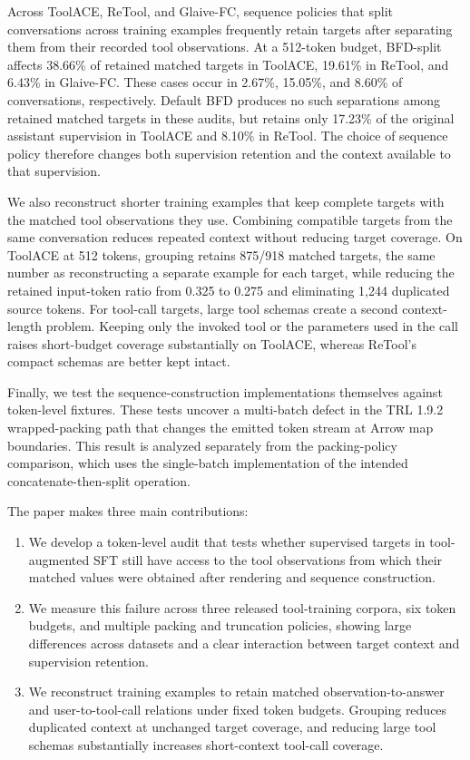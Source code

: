 \documentclass[pdflatex,sn-basic,Numbered]{sn-jnl}
\begin{document}
Across ToolACE, ReTool, and Glaive-FC, sequence policies that split conversations across training examples frequently retain targets after separating them from their recorded tool observations. At a 512-token budget, BFD-split affects 38.66\% of retained matched targets in ToolACE, 19.61\% in ReTool, and 6.43\% in Glaive-FC. These cases occur in 2.67\%, 15.05\%, and 8.60\% of conversations, respectively. Default BFD produces no such separations among retained matched targets in these audits, but retains only 17.23\% of the original assistant supervision in ToolACE and 8.10\% in ReTool. The choice of sequence policy therefore changes both supervision retention and the context available to that supervision.

We also reconstruct shorter training examples that keep complete targets with the matched tool observations they use. Combining compatible targets from the same conversation reduces repeated context without reducing target coverage. On ToolACE at 512 tokens, grouping retains 875/918 matched targets, the same number as reconstructing a separate example for each target, while reducing the retained input-token ratio from 0.325 to 0.275 and eliminating 1,244 duplicated source tokens. For tool-call targets, large tool schemas create a second context-length problem. Keeping only the invoked tool or the parameters used in the call raises short-budget coverage substantially on ToolACE, whereas ReTool's compact schemas are better kept intact.

Finally, we test the sequence-construction implementations themselves against token-level fixtures. These tests uncover a multi-batch defect in the TRL 1.9.2 wrapped-packing path that changes the emitted token stream at Arrow map boundaries. This result is analyzed separately from the packing-policy comparison,
which uses the single-batch implementation of the intended concatenate-then-split operation.

The paper makes three main contributions:
\begin{enumerate}
    \item We develop a token-level audit that tests whether supervised targets in tool-augmented SFT still have access to the tool observations from which their matched values were obtained after rendering and sequence construction.

    \item We measure this failure across three released tool-training corpora, six token budgets, and multiple packing and truncation policies, showing large differences across datasets and a clear interaction between target context and supervision retention.

    \item We reconstruct training examples to retain matched observation-to-answer and user-to-tool-call relations under fixed token budgets. Grouping reduces duplicated context at unchanged target coverage, and reducing large tool schemas substantially increases short-context tool-call coverage.
\end{enumerate}
\end{document}
